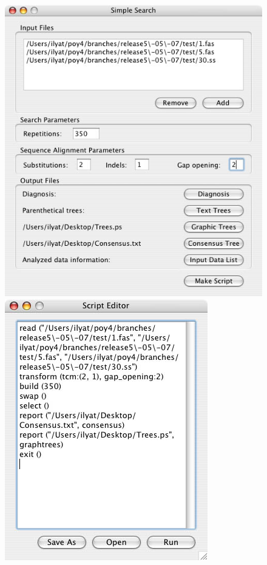 \begin{figure}
\centering
\begin{minipage}[c]{0.48\textwidth}
   		\includegraphics[width=\textwidth]{doc/figures/simplesearch_window_filled.jpg}
\end{minipage}
\quad
\begin{minipage}[c]{0.48\textwidth}
	   	\includegraphics[width=\textwidth]{doc/figures/simplesearch_script.jpg}

\end{minipage}
\end{figure}
